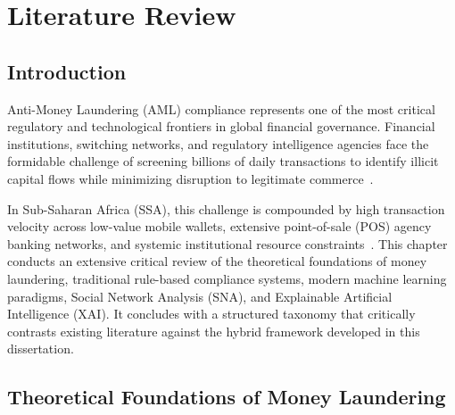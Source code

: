 \chapter{Literature Review} \label{ch:literature}

\section{Introduction}
Anti-Money Laundering (AML) compliance represents one of the most critical regulatory and technological frontiers in global financial governance. Financial institutions, switching networks, and regulatory intelligence agencies face the formidable challenge of screening billions of daily transactions to identify illicit capital flows while minimizing disruption to legitimate commerce~\cite{kumar2012money, korejo2021concept}. 

In Sub-Saharan Africa (SSA), this challenge is compounded by high transaction velocity across low-value mobile wallets, extensive point-of-sale (POS) agency banking networks, and systemic institutional resource constraints~\cite{ali2020evaluation, kiwanuka2020detecting}. This chapter conducts an extensive critical review of the theoretical foundations of money laundering, traditional rule-based compliance systems, modern machine learning paradigms, Social Network Analysis (SNA), and Explainable Artificial Intelligence (XAI). It concludes with a structured taxonomy that critically contrasts existing literature against the hybrid framework developed in this dissertation.

\section{Theoretical Foundations of Money Laundering}

